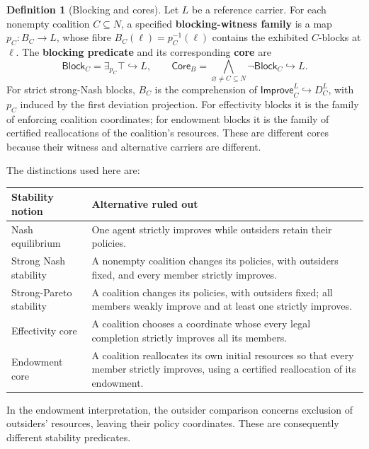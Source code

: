 \documentclass[11pt,a4paper]{article}
\numberwithin{equation}{section}
\theoremstyle{definition}
\newtheorem{definition}[theorem]{Definition}
\theoremstyle{remark}
\theoremstyle{plain}
\begin{document}
\begin{definition}[Blocking and cores]
\label{def:egt-blocking-and-core}
Let $L$ be a reference carrier. For each nonempty coalition
$C\subseteq N$, a specified \textbf{blocking-witness family} is a map
$p_C:B_C\to L$, whose fibre $B_C(\ell)=p_C^{-1}(\ell)$ contains the
exhibited $C$-blocks at $\ell$. The \textbf{blocking predicate} and
its corresponding \textbf{core} are
\[
 \mathsf{Block}_C=\exists_{p_C}\top\hookrightarrow L,
 \qquad
 \mathsf{Core}_{B}=
 \bigwedge_{\varnothing\ne C\subseteq N}
 \neg\mathsf{Block}_C\hookrightarrow L.
\]
For strict strong-Nash blocks, $B_C$ is the comprehension of
$\mathsf{Improve}_C^L\hookrightarrow D_C^L$, with $p_C$ induced by
the first deviation projection. For effectivity blocks it is the
family of enforcing coalition coordinates; for endowment blocks it is
the family of certified reallocations of the coalition's resources.
These are different cores because their witness and alternative
carriers are different.
\end{definition}
The distinctions used here are:
\begin{center}
\begin{tabular}{@{}p{}p{}@{}}
\toprule
Stability notion & Alternative ruled out\\
\midrule
Nash equilibrium & One agent strictly improves while outsiders retain
their policies.\\
Strong Nash stability & A nonempty coalition changes its policies,
with outsiders fixed, and every member strictly improves.\\
Strong-Pareto stability & A coalition changes its policies,
with outsiders fixed; all members weakly improve and at least one
strictly improves.\\
Effectivity core & A coalition chooses a coordinate whose every legal
completion strictly improves all its members.\\
Endowment core & A coalition reallocates its own initial resources so
that every member strictly improves, using a certified reallocation
of its endowment.\\
\bottomrule
\end{tabular}
\end{center}

In the endowment interpretation, the outsider comparison
concerns exclusion of outsiders' resources, leaving their
policy coordinates. These are consequently different stability predicates.
\end{document}
